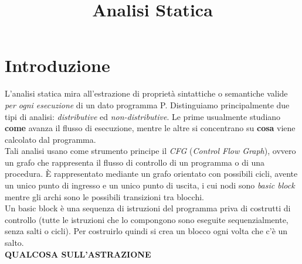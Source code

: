 \documentclass[a4paper,12pt,openany]{article}
\title{Analisi Statica}
\date{}
\begin{document}
    \maketitle
    
    \section*{Introduzione}
    L'analisi statica mira all'estrazione di proprietà sintattiche o semantiche valide \emph{per ogni esecuzione} di un dato programma P. Distinguiamo principalmente due tipi di analisi: \emph{distributive} ed \emph{non-distributive}. Le prime usualmente studiano \textbf{come} avanza il flusso di esecuzione, mentre le altre si concentrano su \textbf{cosa} viene calcolato dal programma.\\[0.5em]
    Tali analisi usano come strumento principe il \emph{CFG} (\emph{Control Flow Graph}), ovvero un grafo che rappresenta il flusso di controllo di un programma o di una procedura. È rappresentato mediante un grafo orientato con possibili cicli, avente un unico punto di ingresso e un unico punto di uscita, i cui nodi sono \emph{basic block} mentre gli archi sono le possibili transizioni tra blocchi.\\
    Un basic block è una sequenza di istruzioni del programma priva di costrutti di controllo (tutte le istruzioni che lo compongono sono eseguite sequenzialmente, senza salti o cicli). Per costruirlo quindi si crea un blocco ogni volta che c'è un salto.\\[3em]
    
    \textbf{QUALCOSA SULL'ASTRAZIONE}
\end{document}
